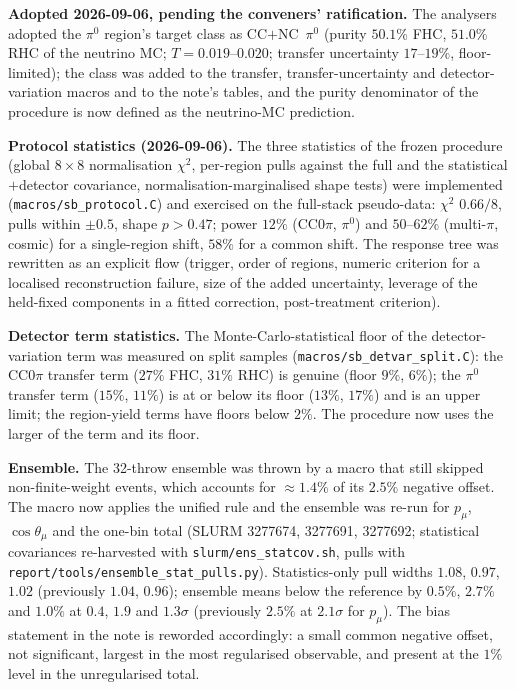 \textbf{Adopted 2026-09-06, pending the conveners' ratification.} The analysers adopted the $\pi^0$ region's target class as
CC$+$NC~$\pi^0$ (purity $50.1\%$ FHC, $51.0\%$ RHC of the neutrino MC; $T=0.019$--$0.020$;
transfer uncertainty $17$--$19\%$, floor-limited); the class was added to the transfer,
transfer-uncertainty and detector-variation macros and to the note's tables, and the
purity denominator of the procedure is now defined as the neutrino-MC prediction.

\textbf{Protocol statistics (2026-09-06).} The three statistics of the frozen procedure
(global $8\times8$ normalisation $\chi^2$, per-region pulls against the full and the
statistical$+$detector covariance, normalisation-marginalised shape tests) were implemented
(\texttt{macros/sb\_protocol.C}) and exercised on the full-stack pseudo-data: $\chi^2$
$0.66/8$, pulls within $\pm0.5$, shape $p>0.47$; power $12\%$ (CC$0\pi$, $\pi^0$) and
$50$--$62\%$ (multi-$\pi$, cosmic) for a single-region shift, $58\%$ for a common shift.
The response tree was rewritten as an explicit flow (trigger, order of regions, numeric
criterion for a localised reconstruction failure, size of the added uncertainty, leverage
of the held-fixed components in a fitted correction, post-treatment criterion).

\textbf{Detector term statistics.} The Monte-Carlo-statistical floor of the
detector-variation term was measured on split samples
(\texttt{macros/sb\_detvar\_split.C}): the CC$0\pi$ transfer term ($27\%$ FHC, $31\%$
RHC) is genuine (floor $9\%$, $6\%$); the $\pi^0$ transfer term ($15\%$, $11\%$) is at or
below its floor ($13\%$, $17\%$) and is an upper limit; the region-yield terms have floors
below $2\%$. The procedure now uses the larger of the term and its floor.

\textbf{Ensemble.} The 32-throw ensemble was thrown by a macro that still skipped
non-finite-weight events, which accounts for $\approx1.4\%$ of its $2.5\%$ negative offset.
The macro now applies the unified rule and the ensemble was re-run for $p_\mu$,
$\cos\theta_\mu$ and the one-bin total (SLURM 3277674, 3277691, 3277692; statistical
covariances re-harvested with \texttt{slurm/ens\_statcov.sh}, pulls with
\texttt{report/tools/ensemble\_stat\_pulls.py}). Statistics-only pull widths $1.08$,
$0.97$, $1.02$ (previously $1.04$, $0.96$); ensemble means below the reference by $0.5\%$,
$2.7\%$ and $1.0\%$ at $0.4$, $1.9$ and $1.3\sigma$ (previously $2.5\%$ at $2.1\sigma$
for $p_\mu$). The bias statement in the note is reworded accordingly: a small common
negative offset, not significant, largest in the most regularised observable, and present
at the $1\%$ level in the unregularised total.

